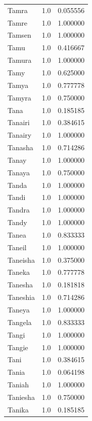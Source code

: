 \documentclass[
  letterpaper,
  DIV=11,
  numbers=noendperiod]{scrreprt}
\begin{document}
\begin{tabular}{lrr}
Tamra           &   1.0 &   0.055556 \\
Tamre           &   1.0 &   1.000000 \\
Tamsen          &   1.0 &   1.000000 \\
Tamu            &   1.0 &   0.416667 \\
Tamura          &   1.0 &   1.000000 \\
Tamy            &   1.0 &   0.625000 \\
Tamya           &   1.0 &   0.777778 \\
Tamyra          &   1.0 &   0.750000 \\
Tana            &   1.0 &   0.185185 \\
Tanairi         &   1.0 &   0.384615 \\
Tanairy         &   1.0 &   1.000000 \\
Tanasha         &   1.0 &   0.714286 \\
Tanay           &   1.0 &   1.000000 \\
Tanaya          &   1.0 &   0.750000 \\
Tanda           &   1.0 &   1.000000 \\
Tandi           &   1.0 &   1.000000 \\
Tandra          &   1.0 &   1.000000 \\
Tandy           &   1.0 &   1.000000 \\
Tanea           &   1.0 &   0.833333 \\
Taneil          &   1.0 &   1.000000 \\
Taneisha        &   1.0 &   0.375000 \\
Taneka          &   1.0 &   0.777778 \\
Tanesha         &   1.0 &   0.181818 \\
Taneshia        &   1.0 &   0.714286 \\
Taneya          &   1.0 &   1.000000 \\
Tangela         &   1.0 &   0.833333 \\
Tangi           &   1.0 &   1.000000 \\
Tangie          &   1.0 &   1.000000 \\
Tani            &   1.0 &   0.384615 \\
Tania           &   1.0 &   0.064198 \\
Taniah          &   1.0 &   1.000000 \\
Taniesha        &   1.0 &   0.750000 \\
Tanika          &   1.0 &   0.185185 \\

\end{tabular}
\end{document}
